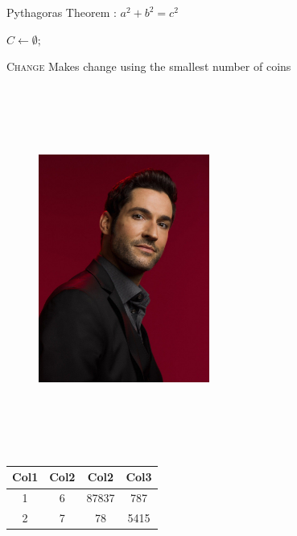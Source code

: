 \documentclass{IEEEtran}
\begin{document}
	
	
	\nocite{*}
	\vspace{2cm}
	Pythagoras Theorem : $a^2 + b^2 = c^2$
	\vspace{2cm}
	\begin{algorithm}
		$C \leftarrow \emptyset;$
		
		\caption{\textsc{Change} Makes change using the smallest number of coins}
	\end{algorithm}
	\vspace{2cm}
	\begin{figure}
		\includegraphics[width=0.5\textwidth,height=12cm]{hhh}
	\end{figure}
\begin{tabular}{||c c c c||} 
\hline
Col1 & Col2 & Col2 & Col3 \\ [0.5ex] 
\hline\hline
1 & 6 & 87837 & 787 \\ 
\hline
2 & 7 & 78 & 5415 \\
\hline
\end{tabular}
\end{document}
